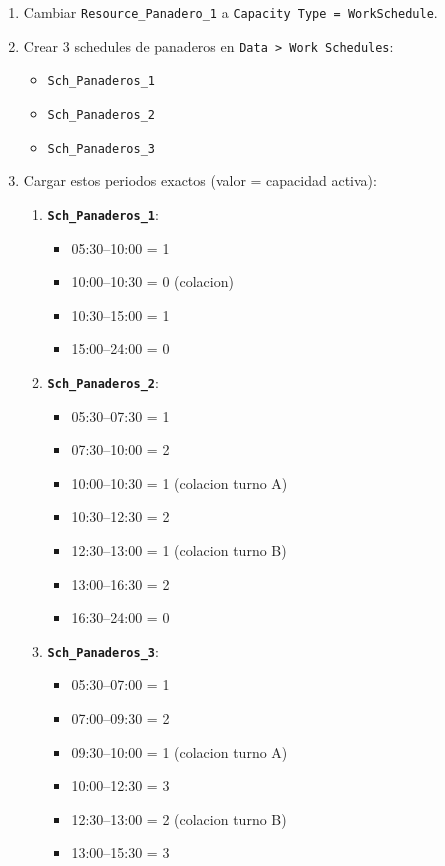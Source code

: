 \documentclass[11pt]{article}
\newcommand{\simio}[1]{\texttt{#1}}
\begin{document}
\begin{enumerate}
  \item Cambiar \simio{Resource\_Panadero\_1} a \simio{Capacity Type = WorkSchedule}.
  \item Crear 3 schedules de panaderos en \simio{Data > Work Schedules}:
  \begin{itemize}
    \item \simio{Sch\_Panaderos\_1}
    \item \simio{Sch\_Panaderos\_2}
    \item \simio{Sch\_Panaderos\_3}
  \end{itemize}
  \item Cargar estos periodos exactos (valor = capacidad activa):
  \begin{enumerate}
    \item \textbf{\simio{Sch\_Panaderos\_1}}:
    \begin{itemize}
      \item 05:30--10:00 = 1
      \item 10:00--10:30 = 0 (colacion)
      \item 10:30--15:00 = 1
      \item 15:00--24:00 = 0
    \end{itemize}
    \item \textbf{\simio{Sch\_Panaderos\_2}}:
    \begin{itemize}
      \item 05:30--07:30 = 1
      \item 07:30--10:00 = 2
      \item 10:00--10:30 = 1 (colacion turno A)
      \item 10:30--12:30 = 2
      \item 12:30--13:00 = 1 (colacion turno B)
      \item 13:00--16:30 = 2
      \item 16:30--24:00 = 0
    \end{itemize}
    \item \textbf{\simio{Sch\_Panaderos\_3}}:
    \begin{itemize}
      \item 05:30--07:00 = 1
      \item 07:00--09:30 = 2
      \item 09:30--10:00 = 1 (colacion turno A)
      \item 10:00--12:30 = 3
      \item 12:30--13:00 = 2 (colacion turno B)
      \item 13:00--15:30 = 3

\end{itemize}
\end{enumerate}
\end{enumerate}
\end{document}
